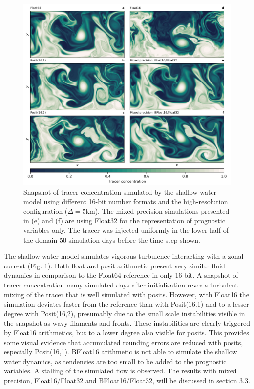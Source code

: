 \begin{figure}
\includegraphics[width=1\textwidth]{Figures/swm/snapshot.png}
\caption{Snapshot of tracer concentration simulated by the shallow water model
using different 16-bit number formats and the high-resolution configuration
($\Delta = 5$km). The mixed precision simulations presented in (e) and (f) are
using Float32 for the representation of prognostic variables only. The tracer
was injected uniformly in the lower half of the domain 50 simulation days before
the time step shown.}
\label{fig:snapshot}
\end{figure}

The shallow water model simulates vigorous turbulence interacting with a
zonal current (Fig. \ref{fig:snapshot}). Both float and posit arithmetic
present very similar fluid dynamics in comparison to the Float64 reference in
only 16 bit. A snapshot of tracer concentration many simulated days after
initialisation reveals turbulent mixing of the tracer that is well simulated
with posits. However, with Float16 the simulation deviates faster from the
reference than with Posit(16,1) and to a lesser degree with Posit(16,2),
presumably due to the small scale instabilities visible in the snapshot as
wavy filaments and fronts. These instabilities are clearly triggered by Float16
arithmetics, but to a lower degree also visible for posits. This provides some
visual evidence that accumulated rounding errors are reduced with posits, especially
Posit(16,1). BFloat16 arithmetic is not able to simulate the shallow water dynamics,
as tendencies are too small to be added to the prognostic variables. A stalling
of the simulated flow is observed. The results with mixed precision,
Float16/Float32 and BFloat16/Float32, will be discussed in section 3.3.

